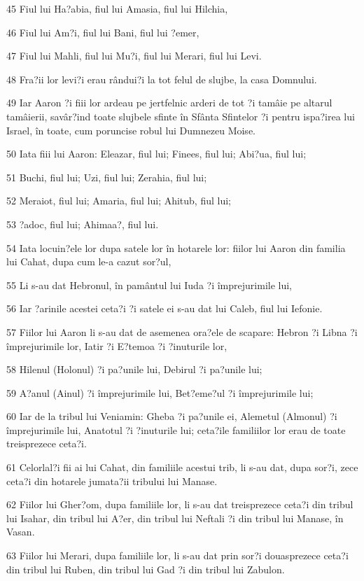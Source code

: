 \par 45 Fiul lui Ha?abia, fiul lui Amasia, fiul lui Hilchia,
\par 46 Fiul lui Am?i, fiul lui Bani, fiul lui ?emer,
\par 47 Fiul lui Mahli, fiul lui Mu?i, fiul lui Merari, fiul lui Levi.
\par 48 Fra?ii lor levi?i erau rândui?i la tot felul de slujbe, la casa Domnului.
\par 49 Iar Aaron ?i fiii lor ardeau pe jertfelnic arderi de tot ?i tamâie pe altarul tamâierii, savâr?ind toate slujbele sfinte în Sfânta Sfintelor ?i pentru ispa?irea lui Israel, în toate, cum poruncise robul lui Dumnezeu Moise.
\par 50 Iata fiii lui Aaron: Eleazar, fiul lui; Finees, fiul lui; Abi?ua, fiul lui;
\par 51 Buchi, fiul lui; Uzi, fiul lui; Zerahia, fiul lui;
\par 52 Meraiot, fiul lui; Amaria, fiul lui; Ahitub, fiul lui;
\par 53 ?adoc, fiul lui; Ahimaa?, fiul lui.
\par 54 Iata locuin?ele lor dupa satele lor în hotarele lor: fiilor lui Aaron din familia lui Cahat, dupa cum le-a cazut sor?ul,
\par 55 Li s-au dat Hebronul, în pamântul lui Iuda ?i împrejurimile lui,
\par 56 Iar ?arinile acestei ceta?i ?i satele ei s-au dat lui Caleb, fiul lui Iefonie.
\par 57 Fiilor lui Aaron li s-au dat de asemenea ora?ele de scapare: Hebron ?i Libna ?i împrejurimile lor, Iatir ?i E?temoa ?i ?inuturile lor,
\par 58 Hilenul (Holonul) ?i pa?unile lui, Debirul ?i pa?unile lui;
\par 59 A?anul (Ainul) ?i împrejurimile lui, Bet?eme?ul ?i împrejurimile lui;
\par 60 Iar de la tribul lui Veniamin: Gheba ?i pa?unile ei, Alemetul (Almonul) ?i împrejurimile lui, Anatotul ?i ?inuturile lui; ceta?ile familiilor lor erau de toate treisprezece ceta?i.
\par 61 Celorlal?i fii ai lui Cahat, din familiile acestui trib, li s-au dat, dupa sor?i, zece ceta?i din hotarele jumata?ii tribului lui Manase.
\par 62 Fiilor lui Gher?om, dupa familiile lor, li s-au dat treisprezece ceta?i din tribul lui Isahar, din tribul lui A?er, din tribul lui Neftali ?i din tribul lui Manase, în Vasan.
\par 63 Fiilor lui Merari, dupa familiile lor, li s-au dat prin sor?i douasprezece ceta?i din tribul lui Ruben, din tribul lui Gad ?i din tribul lui Zabulon.
